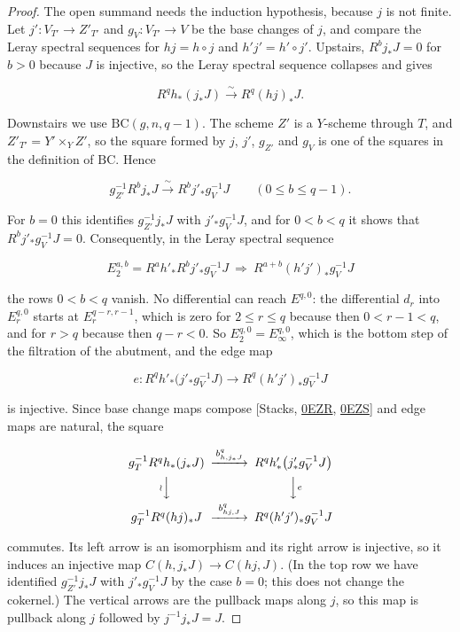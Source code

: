 \documentclass[11pt]{article}
\begin{document}
\begin{proof}[{Proof}]
The open summand needs the induction hypothesis, because \(j\) is not finite. Let \(j':V_{T'}\to Z'_{T'}\) and \(g_V:V_{T'}\to V\) be the base changes of \(j\), and compare the Leray spectral sequences for \(hj=h\circ j\) and \(h'j'=h'\circ j'\). Upstairs, \(R^bj_*J=0\) for \(b>0\) because \(J\) is injective, so the Leray spectral sequence collapses and gives

\[
R^qh_*(j_*J)\xrightarrow{\ \sim\ }R^q(hj)_*J .
\]

Downstairs we use \(\mathrm{BC}(g,n,q-1)\). The scheme \(Z'\) is a \(Y\)-scheme through \(T\), and \(Z'_{T'}=Y'\times_YZ'\), so the square formed by \(j\), \(j'\), \(g_{Z'}\) and \(g_V\) is one of the squares in the definition of \(\mathrm{BC}\). Hence

\[
g_{Z'}^{-1}R^bj_*J\xrightarrow{\ \sim\ }R^bj'_*g_V^{-1}J
\qquad(0\le b\le q-1).
\]

For \(b=0\) this identifies \(g_{Z'}^{-1}j_*J\) with \(j'_*g_V^{-1}J\), and for \(0<b<q\) it shows that \(R^bj'_*g_V^{-1}J=0\). Consequently, in the Leray spectral sequence

\[
E_2^{a,b}=R^ah'_*R^bj'_*g_V^{-1}J\ \Longrightarrow\
R^{a+b}(h'j')_*g_V^{-1}J
\]

the rows \(0<b<q\) vanish. No differential can reach \(E^{q,0}\): the differential \(d_r\) into \(E_r^{q,0}\) starts at \(E_r^{q-r,r-1}\), which is zero for \(2\le r\le q\) because then \(0<r-1<q\), and for \(r>q\) because then \(q-r<0\). So \(E_2^{q,0}=E_\infty^{q,0}\), which is the bottom step of the filtration of the abutment, and the edge map

\[
e:R^qh'_*\bigl(j'_*g_V^{-1}J\bigr)\longrightarrow R^q(h'j')_*g_V^{-1}J
\]

is injective. Since base change maps compose [Stacks, \href{https://stacks.math.columbia.edu/tag/0EZR}{0EZR}, \href{https://stacks.math.columbia.edu/tag/0EZS}{0EZS}] and edge maps are natural, the square

\[
\begin{CD}
g_T^{-1}R^qh_*(j_*J) @>{b^q_{h,j_*J}}>> R^qh'_*\bigl(j'_*g_V^{-1}J\bigr)\\
@V{\wr}VV @VV{e}V\\
g_T^{-1}R^q(hj)_*J @>{b^q_{hj,J}}>> R^q(h'j')_*g_V^{-1}J
\end{CD}
\]

commutes. Its left arrow is an isomorphism and its right arrow is injective, so it induces an injective map \(C(h,j_*J)\to C(hj,J)\). (In the top row we have identified \(g_{Z'}^{-1}j_*J\) with \(j'_*g_V^{-1}J\) by the case \(b=0\); this does not change the cokernel.) The vertical arrows are the pullback maps along \(j\), so this map is pullback along \(j\) followed by \(j^{-1}j_*J=J\).


\end{proof}
\end{document}
